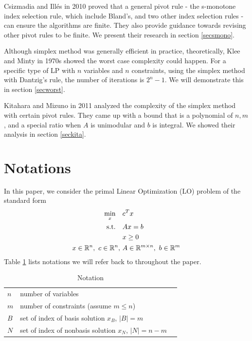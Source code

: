 \documentclass[11pt]{article}
\begin{document}
Csizmadia and Illés in 2010 \cite{csizmadia2012s} proved that a general pivot rule - the s-monotone index selection rule, which include Bland's, and two other index selection rules - can ensure the algorithms are finite. They also provide guidance towards revising other pivot rules to be finite. We present their research in section \ref{secsmono}. 

Although simplex method was generally efficient in practice, theoretically, Klee and Minty \cite{wikipediacontributors_2020_kleeminty} in 1970s showed the worst case complexity could happen. For a specific type of LP with $n$ variables and $n$ constraints, using the simplex method with Dantzig's rule, the number of iterations is $2^n-1$. We will demonstrate this in section \ref{secworst}.

Kitahara and Mizuno in 2011 \cite{kitahara2013bound} analyzed the complexity of the simplex method with certain pivot rules. They came up with a bound that is a polynomial of $n, m$, and a special ratio when $A$ is unimodular and $b$ is integral. We showed their analysis in section \ref{seckita}.

\section{Notations}
In this paper, we consider the primal Linear Optimization (LO) problem of the standard form
\begin{align}
\begin{split}
\min_x \quad &c^Tx\\
\text{s.t.} \quad &Ax = b\\
&x \ge 0\\
 x \in \mathbb{R}^n,\ c \in \mathbb{R}^n,\ &A \in \mathbb{R}^{m\times n},\ b \in \mathbb{R}^m   
\end{split} \label{LOprimal}
\end{align}
Table \ref{tbnotation} lists notations we will refer back to throughout the paper.
\begin{table}[h]
\caption{Notation}
\label{tbnotation}
\centering
\begin{tabular}{lll}
\hline
$n$ & number of variables   &  \\
$m$ & number of constraints (assume $m \le n$) &  \\
$B$ & set of index of basis solution $x_B$, $|B| = m$&  \\
$N$ & set of index of nonbasis solution $x_N$, $|N| = n-m$&  \\
\hline
\end{tabular}
\end{table}
\end{document}
